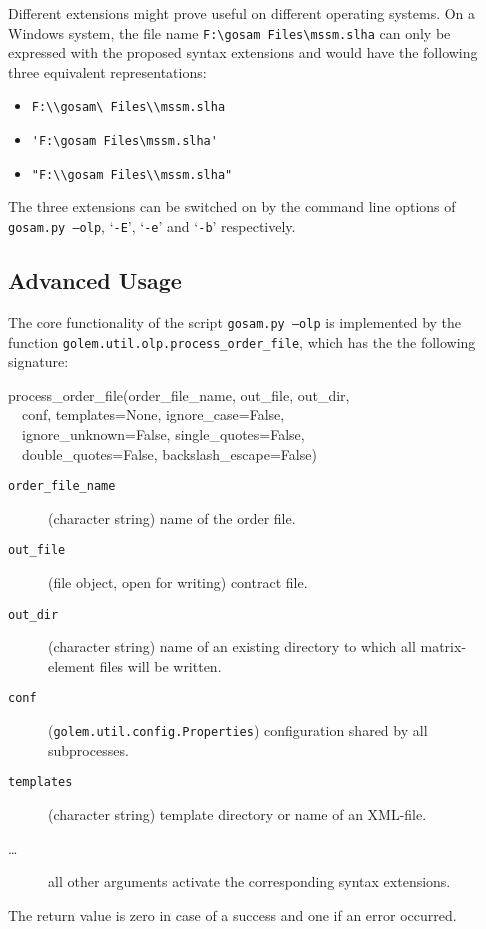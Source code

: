 Different extensions might prove useful on different operating systems.
On a Windows system, the file name \verb!F:\gosam Files\mssm.slha! can
only be expressed with the proposed syntax extensions and would have the
following three equivalent representations:
\begin{itemize}
\item \verb!F:\\gosam\ Files\\mssm.slha!
\item \verb!'F:\gosam Files\mssm.slha'!
\item \verb!"F:\\gosam Files\\mssm.slha"!
\end{itemize}

The three extensions can be switched on by the command line options
of \texttt{gosam.py --olp},
`\texttt{-E}', `\texttt{-e}' and `\texttt{-b}' respectively.

\subsection{Advanced Usage}
The core functionality of the script \texttt{gosam.py --olp} is implemented
by the function \texttt{golem.util.olp.process\_order\_file}, which has the
the following signature:
\begin{example}
process\_order\_file(order\_file\_name, out\_file, out\_dir,\\
   \ \ conf,
   templates=None,
   ignore\_case=False,\\
   \ \ ignore\_unknown=False,
   single\_quotes=False,\\
   \ \ double\_quotes=False,
   backslash\_escape=False)
\end{example}
\begin{description}
\item[\texttt{order\_file\_name}] (character string) name of the order
   file.
\item[\texttt{out\_file}] (file object, open for writing)
   contract file.
\item[\texttt{out\_dir}] (character string) name of an existing directory
   to which all matrix-element files will be written.
\item[\texttt{conf}] (\texttt{golem.util.config.Properties})
   configuration shared by all subprocesses.
\item[\texttt{templates}] (character string) template directory or
   name of an XML-file.
\item[\dots] all other arguments activate the corresponding
   syntax extensions.
\end{description}
The return value is zero in case of a success and one if an error occurred.


